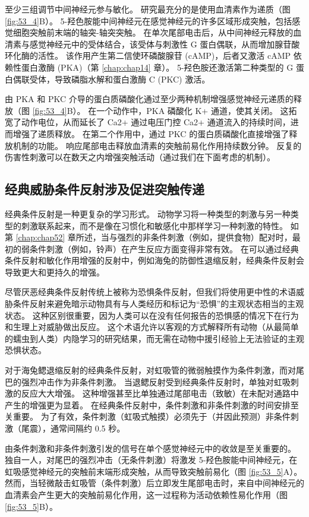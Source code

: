 至少三组调节中间神经元参与敏化。
研究最充分的是使用血清素作为递质（图 \ref{fig:53_4}B）。
5-羟色胺能中间神经元在感觉神经元的许多区域形成突触，包括感觉细胞突触前末端的轴突-轴突突触。
在单次尾部电击后，从中间神经元释放的血清素与感觉神经元中的受体结合，该受体与刺激性 G 蛋白偶联，从而增加腺苷酸环化酶的活性。
该作用产生第二信使环磷酸腺苷 (cAMP)，后者又激活 cAMP 依赖性蛋白激酶 (PKA)（第 \ref{chap:chap14} 章）。
5-羟色胺还激活第二种类型的 G 蛋白偶联受体，导致磷脂水解和蛋白激酶 C (PKC) 激活。


由 PKA 和 PKC 介导的蛋白质磷酸化通过至少两种机制增强感觉神经元递质的释放（图 \ref{fig:53_4}B）。
在一个动作中，PKA 磷酸化 K+ 通道，使其关闭。 这拓宽了动作电位，从而延长了 Ca2+ 通过电压门控 Ca2+ 通道流入的持续时间，进而增强了递质释放。
在第二个作用中，通过 PKC 的蛋白质磷酸化直接增强了释放机制的功能。
响应尾部电击释放血清素的突触前易化作用持续数分钟。
反复的伤害性刺激可以在数天之内增强突触活动（通过我们在下面考虑的机制）。



\subsection{经典威胁条件反射涉及促进突触传递}

经典条件反射是一种更复杂的学习形式。
动物学习将一种类型的刺激与另一种类型的刺激联系起来，而不是像在习惯化和敏感化中那样学习一种刺激的特性。
如第 \ref{chap:chap52} 章所述，当与强烈的非条件刺激（例如，提供食物）配对时，最初的弱条件刺激（例如，铃声）在产生反应方面变得非常有效。
在可以通过经典条件反射和敏化作用增强的反射中，例如海兔的防御性退缩反射，经典条件反射会导致更大和更持久的增强。


尽管厌恶经典条件反射传统上被称为恐惧条件反射，但我们将使用更中性的术语威胁条件反射来避免暗示动物具有与人类经历和标记为“恐惧”的主观状态相当的主观状态。 这种区别很重要，因为人类可以在没有任何报告的恐惧感的情况下在行为和生理上对威胁做出反应。
这个术语允许以客观的方式解释所有动物（从最简单的蠕虫到人类）内隐学习的研究结果，而无需在动物中援引经验上无法验证的主观恐惧状态。


对于海兔鳃退缩反射的经典条件反射，对虹吸管的微弱触摸作为条件刺激，而对尾巴的强烈冲击作为非条件刺激。
当退鳃反射受到经典条件反射时，单独对虹吸刺激的反应大大增强。
这种增强甚至比单独通过尾部电击（致敏）在未配对通路中产生的增强更为显着。 
在经典条件反射中，条件刺激和非条件刺激的时间安排至关重要。
为了有效，条件刺激（虹吸式触摸）必须先于（并因此预测）非条件刺激（尾震），通常间隔约 0.5 秒。


由条件刺激和非条件刺激引发的信号在单个感觉神经元中的收敛是至关重要的。
独自一人，对尾巴的强烈冲击（无条件刺激）将激发 5-羟色胺能中间神经元，在虹吸感觉神经元的突触前末端形成突触，从而导致突触前易化（图 \ref{fig:53_5}A）。
然而，当轻微敲击虹吸管（条件刺激）后立即发生尾部电击时，来自中间神经元的血清素会产生更大的突触前易化作用，这一过程称为活动依赖性易化作用（图 \ref{fig:53_5}B）。


